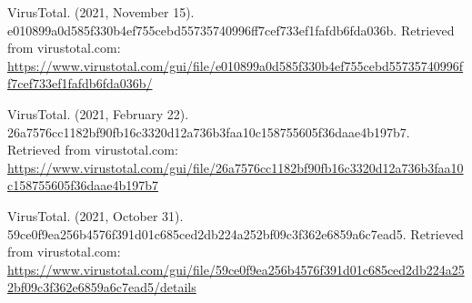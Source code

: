 VirusTotal. (2021, November 15).
    e010899a0d585f330b4ef755cebd55735740996ff7cef733ef1fafdb6fda036b. Retrieved from virustotal.com:
    \url{https://www.virustotal.com/gui/file/e010899a0d585f330b4ef755cebd55735740996ff7cef733ef1fafdb6fda036b/}  

\newpage
VirusTotal. (2021, February 22).
    26a7576cc1182bf90fb16c3320d12a736b3faa10c158755605f36daae4b197b7. Retrieved from virustotal.com:
    \url{https://www.virustotal.com/gui/file/26a7576cc1182bf90fb16c3320d12a736b3faa10c158755605f36daae4b197b7} 

VirusTotal. (2021, October 31).
    59ce0f9ea256b4576f391d01c685ced2db224a252bf09c3f362e6859a6c7ead5. Retrieved from virustotal.com:
    \url{https://www.virustotal.com/gui/file/59ce0f9ea256b4576f391d01c685ced2db224a252bf09c3f362e6859a6c7ead5/details} 
